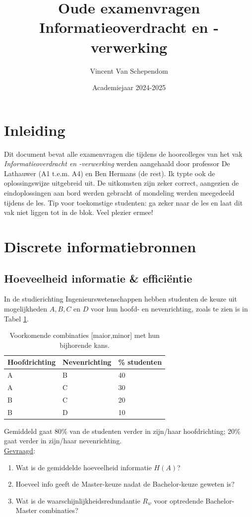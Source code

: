 \documentclass[kulak]{kulakarticle}
\title{Oude examenvragen Informatieoverdracht en -verwerking}
\author{Vincent Van Schependom}
\date{Academiejaar 2024-2025}
\begin{document}
	\maketitle

	\section*{Inleiding}

	Dit document bevat alle examenvragen die tijdens de hoorcolleges van het vak \textit{Informatieoverdracht en -verwerking} werden aangehaald door professor De Lathauwer (A1 t.e.m. A4) en Ben Hermans (de rest). Ik typte ook de oplossingswijze uitgebreid uit. De uitkomsten zijn zeker correct, aangezien de eindoplossingen aan bord werden gebracht of mondeling werden meegedeeld tijdens de les. Tip voor toekomstige studenten: ga zeker naar de les en laat dit vak niet liggen tot in de blok. Veel plezier ermee!

	\section{Discrete informatiebronnen}

	\subsection{Hoeveelheid informatie \& efficiëntie}

	In de studierichting Ingenieurswetenschappen hebben studenten de keuze uit mogelijkheden \(A, B, C\) en \(D\) voor hun hoofd- en nevenrichting, zoals te zien is in Tabel \ref{tab:mogelijkheden}.

	\begin{table}[h!]
		\centering
		\begin{tabular}{l | l | l}
		Hoofdrichting & Nevenrichting & \% studenten \\ \hline
		A & B & 40 \\
		A & C & 30 \\
		B & C & 20 \\
		B & D & 10
		\end{tabular}
		\caption{Voorkomende combinaties [maior,minor] met hun bijhorende kans.}
		\label{tab:mogelijkheden}
	\end{table}

	Gemiddeld gaat 80\% van de studenten verder in zijn/haar hoofdrichting; 20\% gaat verder in zijn/haar nevenrichting.\\

	\underline{Gevraagd}:
	\begin{enumerate}
		\item Wat is de gemiddelde hoeveelheid informatie \(H(A)\)?
		\item Hoeveel info geeft de Master-keuze nadat de Bachelor-keuze geweten is?
		\item Wat is de waarschijnlijkheidsredundantie \(R_w\) voor optredende Bachelor-Master combinaties?
	\end{enumerate}
\end{document}
